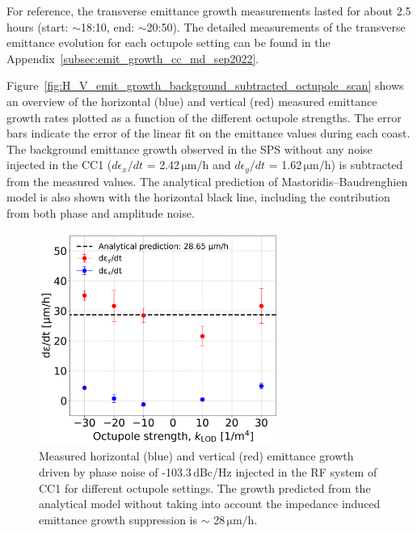 For reference, the transverse emittance growth measurements lasted for about 2.5\,hours (start: $\sim$18:10, end: $\sim$20:50). The detailed measurements of the transverse emittance evolution for each octupole setting can be found in the Appendix~\ref{subsec:emit_growth_cc_md_sep2022}. 

Figure~\ref{fig:H_V_emit_growth_background_subtracted_octupole_scan} shows an overview of the horizontal (blue) and vertical (red) measured emittance growth rates plotted as a function of the different octupole strengths. The error bars indicate the error of the linear fit on the emittance values during each coast. The background emittance growth observed in the SPS without any noise injected in the CC1 ($d\epsilon_x/dt$ = 2.42\,$\mathrm{\mu m/h}$ and $d\epsilon_y/dt$ = 1.62\,$\mathrm{\mu m/h}$) is subtracted from the measured values. The analytical prediction of Mastoridis--Baudrenghien model is also shown with the horizontal black line, including the contribution from both phase and amplitude noise.

\begin{figure}[!h]
   \centering         
   \includegraphics[width=0.7\textwidth]{images/Ch8/emit_H_and_V_octupole_scan_background_growth_subtracted_exp3_sep22.png}
       \caption{Measured horizontal (blue) and vertical (red) emittance growth driven by phase noise of -103.3\,dBc/Hz injected in the RF system of CC1 for different octupole settings. The growth predicted from the analytical model without taking into account the impedance induced emittance growth suppression is $\sim$ 28\,$\mathrm{\mu m/h}$.}
       \label{fig:H_V_emit_growth_background_subtracted_octupole_scan_sep22}
\end{figure}


